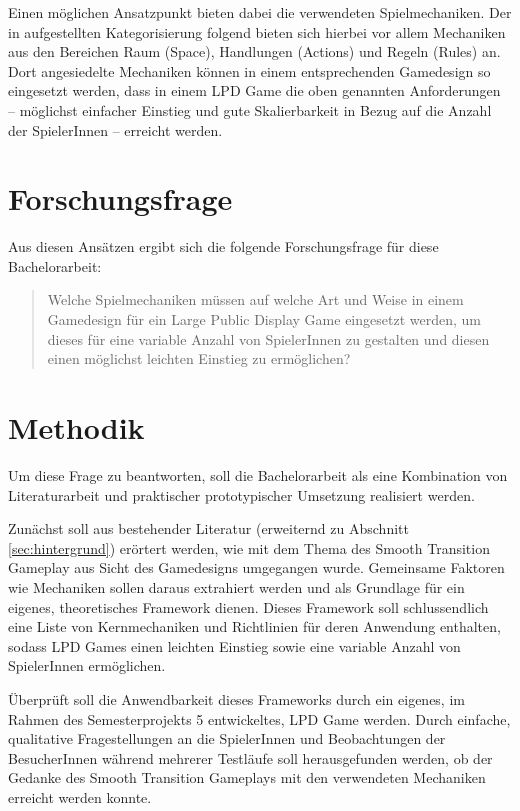Einen möglichen Ansatzpunkt bieten dabei die verwendeten Spielmechaniken. Der in \cite{Schell2014} aufgestellten Kategorisierung folgend bieten sich hierbei vor allem Mechaniken aus den Bereichen Raum (Space), Handlungen (Actions) und Regeln (Rules) an. Dort angesiedelte Mechaniken können in einem entsprechenden Gamedesign so eingesetzt werden, dass in einem LPD Game die oben genannten Anforderungen -- möglichst einfacher Einstieg und gute Skalierbarkeit in Bezug auf die Anzahl der SpielerInnen -- erreicht werden.

\section{Forschungsfrage}

Aus diesen Ansätzen ergibt sich die folgende Forschungsfrage für diese Bachelorarbeit:

\begin{quote}
Welche Spielmechaniken müssen auf welche Art und Weise in einem Gamedesign für ein Large Public Display Game eingesetzt werden, um dieses für eine variable Anzahl von SpielerInnen zu gestalten und diesen einen möglichst leichten Einstieg zu ermöglichen?
\end{quote}

\section{Methodik}

Um diese Frage zu beantworten, soll die Bachelorarbeit als eine Kombination von Literaturarbeit und praktischer \bzw prototypischer Umsetzung realisiert werden.

Zunächst soll aus bestehender Literatur (erweiternd zu Abschnitt \ref{sec:hintergrund}) erörtert werden, wie mit dem Thema des Smooth Transition Gameplay aus Sicht des Gamedesigns umgegangen wurde. Gemeinsame Faktoren wie Mechaniken sollen daraus extrahiert werden und als Grundlage für ein eigenes, theoretisches Framework dienen. Dieses Framework soll schlussendlich eine Liste von Kernmechaniken und Richtlinien für deren Anwendung enthalten, sodass LPD Games einen leichten Einstieg sowie eine variable Anzahl von SpielerInnen ermöglichen.

Überprüft soll die Anwendbarkeit dieses Frameworks durch ein eigenes, im Rahmen des Semesterprojekts 5 entwickeltes, LPD Game werden. Durch einfache, qualitative Fragestellungen an die SpielerInnen und Beobachtungen der BesucherInnen während mehrerer Testläufe soll herausgefunden werden, ob der Gedanke des Smooth Transition Gameplays mit den verwendeten Mechaniken erreicht werden konnte.


